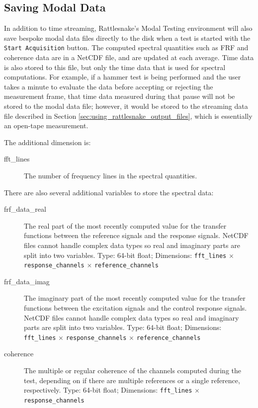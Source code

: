 \documentclass[pdf,12pt,report]{SANDreport}
\newcommand{\inlineCode}{\lstinline[basicstyle=\bfseries\ttfamily]}
\begin{document}
    \subsection{Saving Modal Data}
    In addition to time streaming, Rattlesnake's Modal Testing environment will also save bespoke modal data files directly to the disk when a test is started with the \inlineCode{Start Acquisition} button.  The computed spectral quantities such as \ac{FRF} and coherence data are in a NetCDF file, and are updated at each average.  Time data is also stored to this file, but only the time data that is used for spectral computations.  For example, if a hammer test is being performed and the user takes a minute to evaluate the data before accepting or rejecting the measurement frame, that time data measured during that pause will not be stored to the modal data file; however, it would be stored to the streaming data file described in Section \ref{sec:using_rattlesnake_output_files}, which is essentially an open-tape measurement.
    
    The additional dimension is:
    
    \begin{description}
        \item[fft\_lines] The number of frequency lines in the spectral quantities.
    \end{description}
    
    There are also several additional variables to store the spectral data:
    
    \begin{description}
        \item[frf\_data\_real] The real part of the most recently computed value for the transfer functions between the reference signals and the response signals.  NetCDF files cannot handle complex data types so real and imaginary parts are split into two variables.  Type: 64-bit float; Dimensions: \inlineCode{fft_lines} $\times$ \inlineCode{response_channels} $\times$ \inlineCode{reference_channels}
        
        \item[frf\_data\_imag] The imaginary part of the most recently computed value for the transfer functions between the excitation signals and the control response signals.  NetCDF files cannot handle complex data types so real and imaginary parts are split into two variables.  Type: 64-bit float; Dimensions: \inlineCode{fft_lines} $\times$ \inlineCode{response_channels} $\times$ \inlineCode{reference_channels}
        
        \item[coherence] The multiple or regular coherence of the channels computed during the test, depending on if there are multiple references or a single reference, respectively.  Type: 64-bit float; Dimensions: \inlineCode{fft_lines} $\times$ \inlineCode{response_channels}
        
    \end{description}
\end{document}
